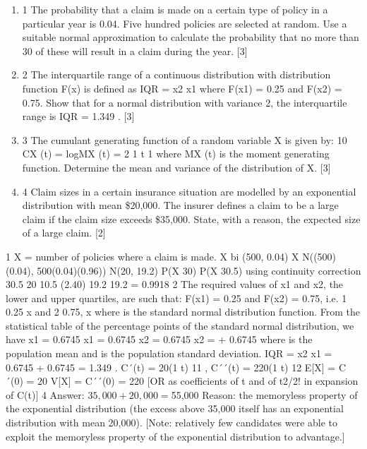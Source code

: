 \documentclass[a4paper,12pt]{article}
\begin{document}
\begin{enumerate}
\item
1 The probability that a claim is made on a certain type of policy in a particular year is
0.04. Five hundred policies are selected at random.
Use a suitable normal approximation to calculate the probability that no more than 30
of these will result in a claim during the year. [3]
\item 2 The interquartile range of a continuous distribution with distribution function F(x) is
defined as IQR = x2 x1 where F(x1) = 0.25 and F(x2) = 0.75.
Show that for a normal distribution with variance 2, the interquartile range is
IQR = 1.349 . [3]
\item 3 The cumulant generating function of a random variable X is given by:
10 CX (t) = logMX (t) = 2 1 t 1
where MX (t) is the moment generating function.
Determine the mean and variance of the distribution of X. [3]
\item 4 Claim sizes in a certain insurance situation are modelled by an exponential
distribution with mean \$20,000. The insurer defines a claim to be a large claim if the
claim size exceeds \$35,000.
State, with a reason, the expected size of a large claim. [2]
\end{enumerate}
\newpage

1 X = number of policies where a claim is made.
X bi (500, 0.04)
X N((500)(0.04), 500(0.04)(0.96)) N(20, 19.2)
P(X 30) P(X 30.5) using continuity correction
30.5 20 10.5
(2.40)
19.2 19.2
= 0.9918
2 The required values of x1 and x2, the lower and upper quartiles, are such that:
F(x1) = 0.25 and F(x2) = 0.75,
i.e. 1 0.25
x
and 2 0.75,
x
where is the standard normal distribution function.
From the statistical table of the percentage points of the standard normal distribution,
we have
x1
= 0.6745 x1 = 0.6745
x2
= 0.6745 x2 = + 0.6745
where is the population mean and is the population standard deviation.
IQR = x2 x1
= 0.6745 + 0.6745
= 1.349 .
 C´(t) = 20(1 t) 11 , C´´(t) = 220(1 t) 12
E[X] = C´(0) = 20
V[X] = C´´(0) = 220
[OR as coefficients of t and of t2/2! in expansion of C(t)]
4 Answer: $35,000 + 20,000 = $55,000
Reason: the memoryless property of the exponential distribution (the excess above
35,000 itself has an exponential distribution with mean 20,000).
[Note: relatively few candidates were able to exploit the memoryless property of the
exponential distribution to advantage.]
\end{document}
